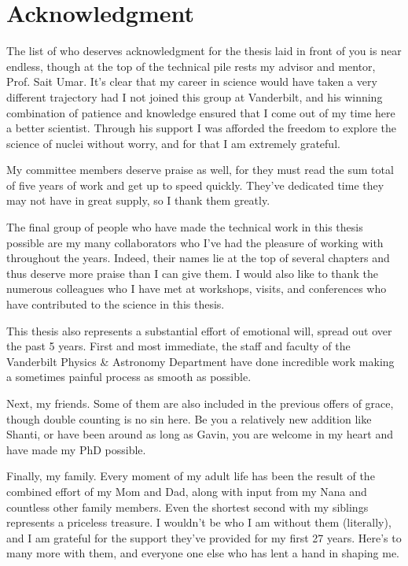 
\chapter*{Acknowledgment}\label{acknowledgment}
\vspace{7mm}

The list of who deserves acknowledgment for the thesis laid in front of you is near endless, though at the top of the technical pile rests my advisor and mentor, Prof. Sait Umar.
It's clear that my career in science would have taken a very different trajectory had I not joined this group at Vanderbilt, and his winning combination of patience and knowledge ensured that I come out of my time here a better scientist.
Through his support I was afforded the freedom to explore the science of nuclei without worry, and for that I am extremely grateful.

My committee members deserve praise as well, for they must read the sum total of five years of work and get up to speed quickly.
They've dedicated time they may not have in great supply, so I thank them greatly.

The final group of people who have made the technical work in this thesis possible are my many collaborators who I've had the pleasure of working with throughout the years.
Indeed, their names lie at the top of several chapters and thus deserve more praise than I can give them.
I would also like to thank the numerous colleagues who I have met at workshops, visits, and conferences who have contributed to the science in this thesis.

This thesis also represents a substantial effort of emotional will, spread out over the past 5 years.
First and most immediate, the staff and faculty of the Vanderbilt Physics \& Astronomy Department have done incredible work making a sometimes painful process as smooth as possible.

Next, my friends.
Some of them are also included in the previous offers of grace, though double counting is no sin here.
Be you a relatively new addition like Shanti, or have been around as long as Gavin, you are welcome in my heart and have made my PhD possible.

Finally, my family.
Every moment of my adult life has been the result of the combined effort of my Mom and Dad, along with input from my Nana and countless other family members.
Even the shortest second with my siblings represents a priceless treasure.
I wouldn't be who I am without them (literally), and I am grateful for the support they've provided for my first 27 years.
Here's to many more with them, and everyone one else who has lent a hand in shaping me.




